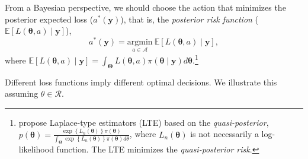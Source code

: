 From a Bayesian perspective, we should choose the action that minimizes the posterior expected loss ($a^*(\mathbf{y})$), that is, the \textit{posterior risk function} ($\mathbb{E}[L(\bm{\theta}, a)\mid \mathbf{y}]$),
\begin{equation*}
	a^*(\mathbf{y})=\underset{a \in \mathcal{A}}{\mathrm{argmin}} \  \mathbb{E}[L(\bm{\theta}, a)\mid \mathbf{y}], 
\end{equation*}
where $\mathbb{E}[L(\bm{\theta}, a)\mid \mathbf{y}] = \int_{\mathbf{\Theta}} L(\bm{\theta}, a)\pi(\bm{\theta}\mid \mathbf{y})d\bm{\theta}$.\footnote{\cite{Chernozhukov2003} propose Laplace-type estimators (LTE) based on the \textit{quasi-posterior}, $p(\bm{\theta})=\frac{\exp\left\{L_n(\bm{\theta})\right\}\pi(\bm{\theta})}{\int_{\mathbf{\Theta}}\exp\left\{L_n(\bm{\theta})\right\}\pi(\bm{\theta})d\theta}$, where $L_n(\bm{\theta})$ is not necessarily a log-likelihood function. The LTE minimizes the \textit{quasi-posterior risk}.}

Different loss functions imply different optimal decisions. We illustrate this assuming $\theta \in \mathcal{R}$.

